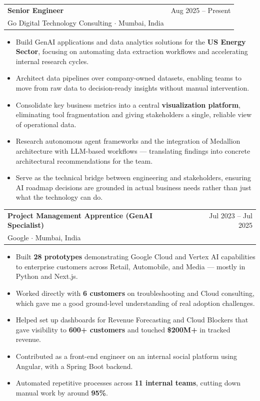 \documentclass[11pt, a4paper]{article}
\makeatletter
\newcommand{\jobentry}[5]{%
    \vspace{2pt}
    \noindent
    \begin{tabularx}{\textwidth}{@{}X r@{}}
        {\bfseries\color{darkgray} #3} & {\small\color{midgray} #4} \\
        {\color{accentblue} #1} \textnormal{{\small\color{midgray}$\cdot$ #2}} & \\
    \end{tabularx}
    \vspace{-4pt}
    \begin{itemize}[leftmargin=1.2em, itemsep=1pt, parsep=0pt, topsep=2pt, nosep, label=\textbullet]
        #5
    \end{itemize}
}
\makeatother
\begin{document}
\jobentry
    {Go Digital Technology Consulting}
    {Mumbai, India}
    {Senior Engineer}
    {Aug 2025 -- Present}
    {
        \item Build GenAI applications and data analytics solutions for the \textbf{US Energy Sector}, focusing on automating data extraction workflows and accelerating internal research cycles.
        \item Architect data pipelines over company-owned datasets, enabling teams to move from raw data to decision-ready insights without manual intervention.
        \item Consolidate key business metrics into a central \textbf{visualization platform}, eliminating tool fragmentation and giving stakeholders a single, reliable view of operational data.
        \item Research autonomous agent frameworks and the integration of Medallion architecture with LLM-based workflows --- translating findings into concrete architectural recommendations for the team.
        \item Serve as the technical bridge between engineering and stakeholders, ensuring AI roadmap decisions are grounded in actual business needs rather than just what the technology can do.
    }

\jobentry
    {Google}
    {Mumbai, India}
    {Project Management Apprentice (GenAI Specialist)}
    {Jul 2023 -- Jul 2025}
    {
        \item Built \textbf{28 prototypes} demonstrating Google Cloud and Vertex AI capabilities to enterprise customers across Retail, Automobile, and Media --- mostly in Python and Next.js.
        \item Worked directly with \textbf{6 customers} on troubleshooting and Cloud consulting, which gave me a good ground-level understanding of real adoption challenges.
        \item Helped set up dashboards for Revenue Forecasting and Cloud Blockers that gave visibility to \textbf{600+ customers} and touched \textbf{\$200M+} in tracked revenue.
        \item Contributed as a front-end engineer on an internal social platform using Angular, with a Spring Boot backend.
        \item Automated repetitive processes across \textbf{11 internal teams}, cutting down manual work by around \textbf{95\%}.
    }
\end{document}
